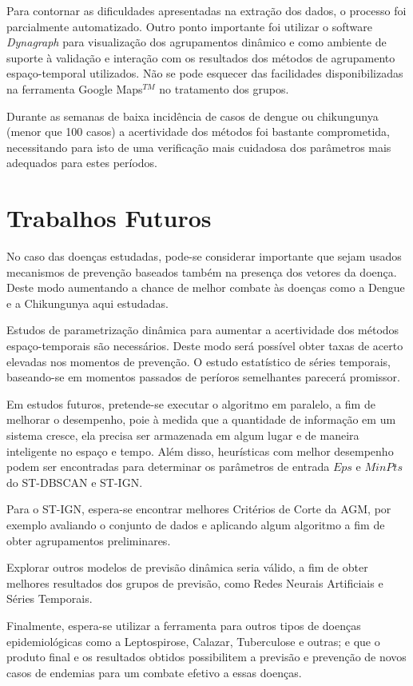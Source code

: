 Para contornar as dificuldades apresentadas na extração dos dados, o processo foi parcialmente automatizado. Outro ponto importante foi utilizar o software \emph{Dynagraph} para visualização dos agrupamentos dinâmico e como ambiente de suporte à validação e interação com os resultados dos métodos de agrupamento espaço-temporal utilizados. Não se pode esquecer das facilidades disponibilizadas na ferramenta Google Maps$^{TM}$ no tratamento dos grupos.

Durante as semanas de baixa incidência de casos de dengue ou chikungunya (menor que 100 casos) a acertividade dos métodos foi bastante comprometida, necessitando para isto de uma verificação mais cuidadosa dos parâmetros mais adequados para estes períodos.  

\section{Trabalhos Futuros}
\label{sec:trabalhos-futuros}

No caso das doenças estudadas, pode-se considerar importante que sejam usados mecanismos de prevenção baseados também na presença dos vetores da doença. Deste modo aumentando a chance de melhor combate às doenças como a Dengue e a Chikungunya aqui estudadas. 

Estudos de parametrização dinâmica para aumentar a acertividade dos métodos espaço-temporais são necessários. Deste modo será possível obter taxas de acerto elevadas nos momentos de prevenção. O estudo estatístico de séries temporais, baseando-se em momentos passados de períoros semelhantes parecerá promissor.

Em estudos futuros, pretende-se executar o algoritmo em paralelo, a fim de melhorar o desempenho, poie à medida que a quantidade de informação em um sistema cresce, ela precisa ser armazenada em algum lugar e de maneira inteligente no espaço e tempo. Além disso, heurísticas com melhor desempenho podem ser encontradas para determinar os parâmetros de entrada ${Eps}$ e ${MinPts}$ do ST-DBSCAN e ST-IGN.

Para o ST-IGN, espera-se encontrar melhores Critérios de Corte da AGM, por exemplo avaliando o conjunto de dados e aplicando algum algoritmo a fim de obter agrupamentos preliminares.

Explorar outros modelos de previsão dinâmica seria válido, a fim de obter melhores resultados dos grupos de previsão, como Redes Neurais Artificiais e Séries Temporais.

Finalmente, espera-se utilizar a ferramenta para outros tipos de doenças epidemiológicas como a Leptospirose, Calazar, Tuberculose e outras; e que o produto final e os resultados obtidos possibilitem a previsão e prevenção de novos casos de endemias para um combate efetivo a essas doenças.



